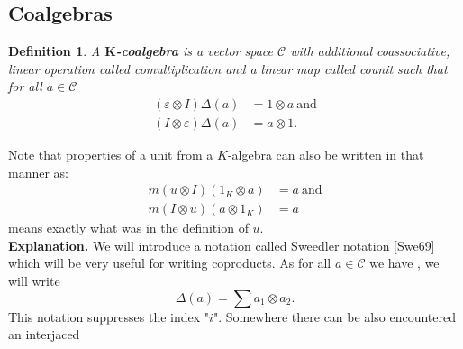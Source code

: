 \documentclass[a4paper, 12pt]{article}
\newtheorem{definition}{Definition}
\begin{document}
\subsection{Coalgebras}
\begin{definition}
A \textbf{$\textbf{K}$-coalgebra} is a vector space $\mathcal{C}$
with additional coassociative, linear operation
 called comultiplication and
a linear map  called counit such that for all
$a \in \mathcal{C}$
\begin{align*}
(\varepsilon \otimes I)\Delta(a) &= 1 \otimes a \mathrm{\ and} \\
(I \otimes \varepsilon)\Delta(a) &= a \otimes 1.
\end{align*}
\end{definition}
Note that properties of a unit from a $K$-algebra can also be written in that manner as:
\begin{align*}
m(u \otimes I)(1_K \otimes a) &= a \mathrm{\ and}\\
m(I \otimes u)(a \otimes 1_K) &= a
\end{align*}
means exactly what was in the definition of $u$. \\[8pt]
\textbf{Explanation.} We will introduce a notation called Sweedler notation [Swe69] which will be
very useful
for writing coproducts. As for all $a \in \mathcal{C}$ we have
, we will write
\begin{equation*}
\Delta(a) = \displaystyle\sum a_1 \otimes a_2.
\end{equation*}
This notation suppresses the index "$i$". Somewhere there can be also encountered an interjaced
\end{document}
